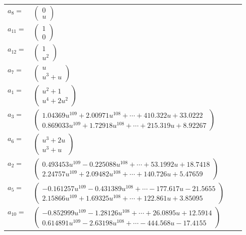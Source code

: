 \documentclass[1p]{elsarticle_modified}
\theoremstyle{definition}
\begin{document}
\begin{tabular}{m{7pt} m{180pt} m{7pt} m{180pt} }
\flushright $a_{8}=$&$\begin{pmatrix}0\\u\end{pmatrix}$ \\
\flushright $a_{11}=$&$\begin{pmatrix}1\\0\end{pmatrix}$ \\
\flushright $a_{12}=$&$\begin{pmatrix}1\\u^2\end{pmatrix}$ \\
\flushright $a_{7}=$&$\begin{pmatrix}u\\u^3+u\end{pmatrix}$ \\
\flushright $a_{1}=$&$\begin{pmatrix}u^2+1\\u^4+2 u^2\end{pmatrix}$ \\
\flushright $a_{3}=$&$\begin{pmatrix}1.04369 u^{109}+2.00971 u^{108}+\cdots+410.322 u+33.0222\\0.869033 u^{109}+1.72918 u^{108}+\cdots+215.319 u+8.92267\end{pmatrix}$ \\
\flushright $a_{6}=$&$\begin{pmatrix}u^3+2 u\\u^3+u\end{pmatrix}$ \\
\flushright $a_{2}=$&$\begin{pmatrix}0.493453 u^{109}-0.225088 u^{108}+\cdots+53.1992 u+18.7418\\2.24757 u^{109}+2.09482 u^{108}+\cdots+140.726 u+5.47659\end{pmatrix}$ \\
\flushright $a_{5}=$&$\begin{pmatrix}-0.161257 u^{109}-0.431389 u^{108}+\cdots-177.617 u-21.5655\\2.15866 u^{109}+1.69325 u^{108}+\cdots+122.861 u+3.85095\end{pmatrix}$ \\
\flushright $a_{10}=$&$\begin{pmatrix}-0.852999 u^{109}-1.28126 u^{108}+\cdots+26.0895 u+12.5914\\0.614891 u^{109}-2.63198 u^{108}+\cdots-444.568 u-17.4155\end{pmatrix}$ \\

\end{tabular}
\end{document}
